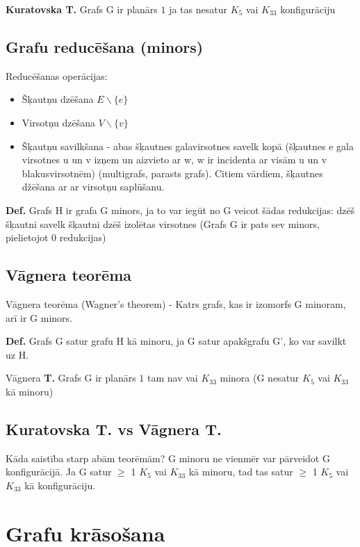 \documentclass{article}
\begin{document}
\textbf{Kuratovska T.} Grafs G ir planārs $1$ ja tas nesatur $K_5$ vai $K_{33}$ konfigurāciju

\subsection{Grafu reducēšana (minors)}

Reducēšanas operācijas:
\begin{itemize}
	\item Šķautņu dzēšana $E \backslash \{e\}$
	\item Virsotņu dzēšana $V \backslash \{v\}$
	\item Šķautņu savilkšana - abas šķautnes galavirsotnes savelk kopā (šķautnes e gala virsotnes u un v izņem un aizvieto ar w, w ir incidenta ar visām u un v blakusvirsotnēm) (multigrafs, parasts grafs). Citiem vārdiem, šķautnes džēšana ar ar virsotņu saplūšanu.
\end{itemize}

\textbf{Def.}  Grafs H ir grafa G minors, ja to var iegūt no G veicot šādas redukcijas: dzēš šķautni savelk šķautni dzēš izolētas virsotnes (Grafs G ir pats sev minors, pielietojot 0 redukcijas)

\subsection{Vāgnera teorēma}

Vāgnera teorēma (Wagner's theorem) - Katrs grafs, kas ir izomorfs G minoram, arī ir G minors.

\textbf{Def.}  Grafs G satur grafu H kā minoru, ja G satur apakšgrafu G', ko var savilkt uz H.

Vāgnera \textbf{T. } Grafs G ir planārs $1$ tam nav vai $K_{33}$ minora (G nesatur $K_5$ vai $K_{33}$ kā minoru)

\subsection{Kuratovska \textbf{T. } vs Vāgnera \textbf{T. }}
Kāda saistība starp abām teorēmām?
G minoru ne vienmēr var pārveidot G konfigurācijā. Ja G satur $\ge$ 1 $K_5$ vai $K_{33}$ kā minoru, tad tas satur $\ge$ 1 $K_5$ vai $K_{33}$ kā konfigurāciju.

\section{Grafu krāsošana}
\end{document}
